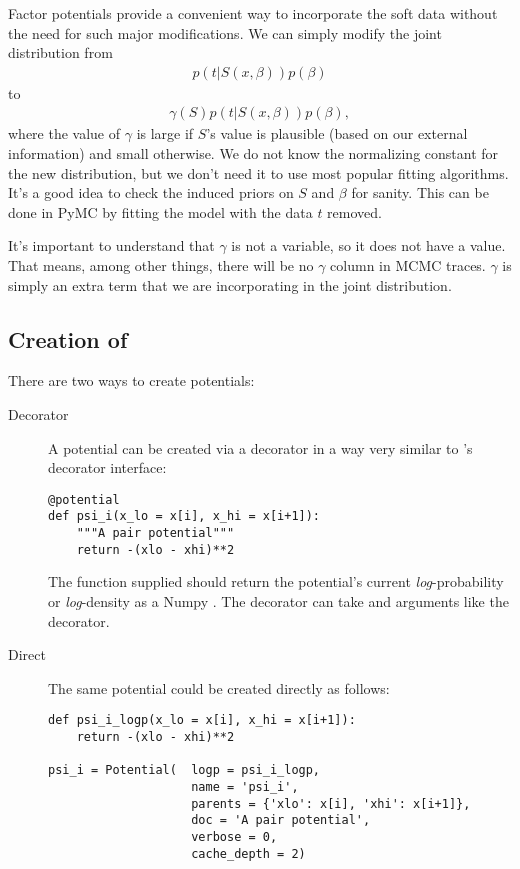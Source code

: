 Factor potentials provide a convenient way to incorporate the soft data without the need for such major modifications. We can simply modify the joint distribution from
\begin{eqnarray*}
    p(t|S(x,\beta)) p(\beta)
\end{eqnarray*}
to
\begin{eqnarray*}
    \gamma(S) p(t|S(x,\beta)) p(\beta),
\end{eqnarray*}
where the value of $\gamma$ is large if $S$'s value is plausible (based on our external information) and small otherwise. We do not know the normalizing constant for the new distribution, but we don't need it to use most popular fitting algorithms. It's a good idea to check the induced priors on $S$ and $\beta$ for sanity. This can be done in PyMC by fitting the model with the data $t$ removed.

It's important to understand that $\gamma$ is not a variable, so it does not have a value. That means, among other things, there will be no $\gamma$ column in MCMC traces. $\gamma$ is simply an extra term that we are incorporating in the joint distribution.


\subsection[Creation of Potentials]{Creation of }
There are two ways to create potentials:
\begin{description}
    \item[Decorator] A potential can be created via a decorator in a way very similar to 's decorator interface:
\begin{verbatim}
@potential
def psi_i(x_lo = x[i], x_hi = x[i+1]):
    """A pair potential"""
    return -(xlo - xhi)**2
\end{verbatim}
The function supplied should return the potential's current \emph{log}-probability or \emph{log}-density as a Numpy . The  decorator can take  and  arguments like the  decorator.
    \item[Direct] The same potential could be created directly as follows:
\begin{verbatim}
def psi_i_logp(x_lo = x[i], x_hi = x[i+1]):
    return -(xlo - xhi)**2

psi_i = Potential(  logp = psi_i_logp,
                    name = 'psi_i',
                    parents = {'xlo': x[i], 'xhi': x[i+1]},
                    doc = 'A pair potential',
                    verbose = 0,
                    cache_depth = 2)
\end{verbatim}
\end{description}


